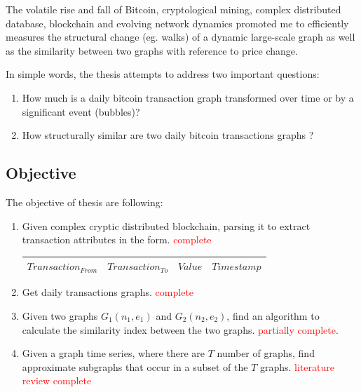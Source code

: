 \documentclass[12pt,a4paper]{article}
\numberwithin{equation}{section}
\numberwithin{figure}{section}
\numberwithin{table}{section}
\begin{document}
The volatile rise and fall of Bitcoin, cryptological mining, complex distributed database, blockchain and evolving network dynamics promoted me to  efficiently measures the structural change (eg. walks) of a dynamic large-scale graph as well as the similarity between two graphs with reference to price change. 

In simple words, the thesis attempts to address two important questions:  
\begin{enumerate}
\item How much is a daily bitcoin transaction graph transformed over time or by a significant event (bubbles)?
\item How structurally similar are two daily bitcoin transactions graphs ?
\end{enumerate}
 


\subsection{Objective}
\label{subsec:Objective}

The objective of thesis are following:
\begin{enumerate}
\item Given complex cryptic distributed blockchain, parsing it to extract transaction attributes in the form. \textcolor{red}{complete}

\begin{center}
\begin{tabular}{ |c|c|c|c| } 
 \hline
 $Transaction_{From}$ & $Transaction_{To}$ & $Value$ & $Timestamp$ \\ 
  \hline
\end{tabular}
\end{center}

\item Get daily transactions graphs. \textcolor{red}{complete}

\item Given two graphs $G_1 (n_1 , e_1 )$ and $G_2 (n_2 , e_2 )$, find an algorithm to calculate the similarity index between the two graphs. \textcolor{red}{partially complete}.

\item Given a graph time series, where there are $T$ number of graphs, find approximate subgraphs that occur in a subset of the $T$ graphs. \textcolor{red}{literature review complete}

\end{enumerate}
\end{document}
